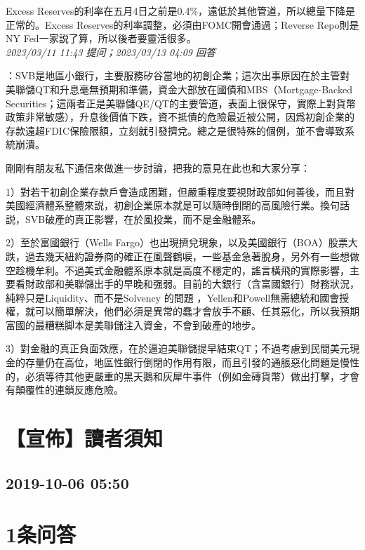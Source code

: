 \documentclass[twocolumn]{ctexart}
\begin{document}
Excess Reserves的利率在五月4日之前是0.4\%，遠低於其他管道，所以總量下降是正常的。Excess Reserves的利率調整，必須由FOMC開會通過；Reverse Repo則是NY Fed一家説了算，所以後者要靈活很多。
\\

\textit{\hfill\noindent\small 2023/03/11 11:43 提问；2023/03/13 04:09 回答}

：SVB是地區小銀行，主要服務矽谷當地的初創企業；這次出事原因在於主管對美聯儲QT和升息毫無預期和準備，資金大部放在國債和MBS（Mortgage-Backed Securities；這兩者正是美聯儲QE/QT的主要管道，表面上很保守，實際上對貨幣政策非常敏感），升息後價值下跌，資不抵債的危險最近被公開，因爲初創企業的存款遠超FDIC保險限額，立刻就引發擠兌。總之是很特殊的個例，並不會導致系統崩潰。


剛剛有朋友私下通信來做進一步討論，把我的意見在此也和大家分享：

1）對若干初創企業存款戶會造成困難，但嚴重程度要視財政部如何善後，而且對美國經濟體系整體來説，初創企業原本就是可以隨時倒閉的高風險行業。換句話説，SVB破產的真正影響，在於風投業，而不是金融體系。

2）至於富國銀行（Wells Fargo）也出現擠兌現象，以及美國銀行（BOA）股票大跌，過去幾天紐約證券商的確正在風聲鶴唳，一些基金急著脫身，另外有一些想做空趁機牟利。不過美式金融體系原本就是高度不穩定的，謠言橫飛的實際影響，主要看財政部和美聯儲出手的早晚和强弱。目前的大銀行（含富國銀行）財務狀況，純粹只是Liquidity、而不是Solvency 的問題 ，Yellen和Powell無需總統和國會授權，就可以簡單解決，他們必須是異常的蠢才會放手不顧、任其惡化，所以我預期富國的最糟糕脚本是美聯儲注入資金，不會到破產的地步。

3）對金融的真正負面效應，在於逼迫美聯儲提早結束QT；不過考慮到民間美元現金的存量仍在高位，地區性銀行倒閉的作用有限，而且引發的通脹惡化問題是慢性的，必須等待其他更嚴重的黑天鵝和灰犀牛事件（例如金磚貨幣）做出打擊，才會有顛覆性的連鎖反應危險。
\\


\section{【宣佈】讀者須知}
\subsection{2019-10-06 05:50}


\section{1条问答}
\end{document}

